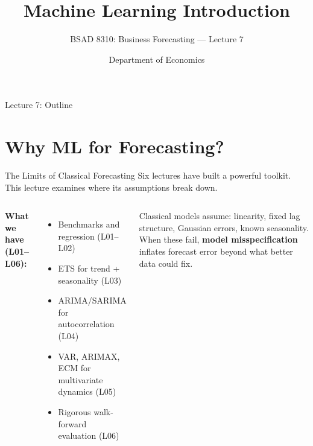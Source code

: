 \documentclass[aspectratio=169, 11pt]{beamer}
\title{Machine Learning Introduction}
\subtitle{BSAD 8310: Business Forecasting --- Lecture 7}
\author{Department of Economics}
\institute{University of Nebraska at Omaha}
\begin{document}

\begin{frame}
  \titlepage
\end{frame}

\begin{frame}{Lecture 7: Outline}
  \tableofcontents
\end{frame}

\section{Why ML for Forecasting?}


\begin{frame}{The Limits of Classical Forecasting}
  Six lectures have built a powerful toolkit. This lecture examines where its assumptions break down.
  \begin{columns}[T]
      \textbf{What we have (L01--L06):}
      \begin{itemize}\small
        \item Benchmarks and regression (L01--L02)
        \item ETS for trend + seasonality (L03)
        \item ARIMA/SARIMA for autocorrelation (L04)
        \item VAR, ARIMAX, ECM for multivariate dynamics (L05)
        \item Rigorous walk-forward evaluation (L06)
      \end{itemize}
      \begin{warningbox}
        {\small Classical models assume: linearity, fixed lag
        structure, Gaussian errors, known seasonality.
        When these fail, \textbf{model misspecification}
        inflates forecast error beyond what better data
        could fix.}
      \end{warningbox}
  \end{columns}
\end{frame}
\end{document}
